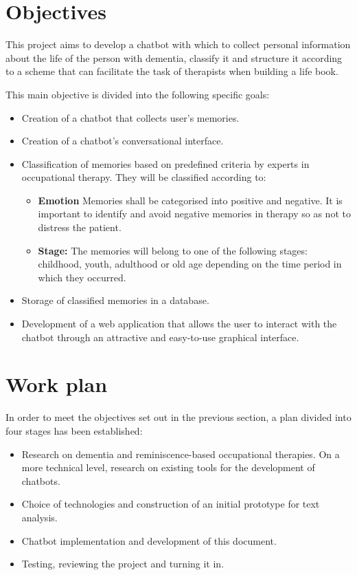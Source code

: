\section{Objectives}

This project aims to develop a chatbot with which to collect personal information about the life of the person with dementia, classify it and structure it according to a scheme that can facilitate the task of therapists when building a life book.

This main objective is divided into the following specific goals:
\begin{itemize}
	\item Creation of a chatbot that collects user's memories.
	\item Creation of a chatbot's conversational interface.
	\item Classification of memories based on predefined criteria by experts in occupational therapy. They will be classified according to:
	\begin{itemize}
		\item \textbf{Emotion} Memories shall be categorised into positive and negative. It is important to identify and avoid negative memories in therapy so as not to distress the patient.
		\item \textbf{Stage:} The memories will belong to one of the following stages: childhood, youth, adulthood or old age depending on the time period in which they occurred.
	\end{itemize}
	\item Storage of classified memories in a database.
	\item Development of a web application that allows the user to interact with the chatbot through an attractive and easy-to-use graphical interface.
\end{itemize}

\section{Work plan}

In order to meet the objectives set out in the previous section, a plan divided into four stages has been established:
\begin{itemize}
	\item Research on dementia and reminiscence-based occupational therapies. On a more technical level, research on existing tools for the development of chatbots.
	\item Choice of technologies and construction of an initial prototype for text analysis.
	\item Chatbot implementation and development of this document.
	\item Testing, reviewing the project and turning it in.
\end{itemize}


